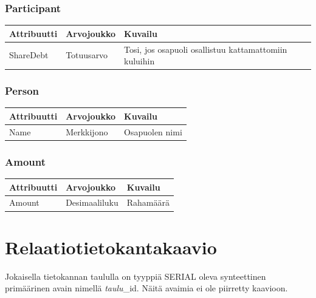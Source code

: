 \documentclass[a4paper,parskip=half]{scrartcl}
\begin{document}
\subsubsection{Participant}
\begin{tabular}{ | l | l | l | }
  \hline
  \textbf{Attribuutti} & \textbf{Arvojoukko} & \textbf{Kuvailu} \\ \hline
  ShareDebt & Totuusarvo & Tosi, jos osapuoli osallistuu
kattamattomiin kuluihin \\ \hline
\end{tabular}

\subsubsection{Person}
\begin{tabular}{ | l | l | l | }
  \hline
  \textbf{Attribuutti} & \textbf{Arvojoukko} & \textbf{Kuvailu} \\ \hline
  Name & Merkkijono & Osapuolen nimi \\ \hline
\end{tabular}

\subsubsection{Amount}
\begin{tabular}{ | l | l | l | }
  \hline
  \textbf{Attribuutti} & \textbf{Arvojoukko} & \textbf{Kuvailu} \\ \hline
  Amount & Desimaaliluku & Rahamäärä \\ \hline
\end{tabular}

\section{Relaatiotietokantakaavio}

Jokaisella tietokannan taululla on tyyppiä SERIAL oleva synteettinen
primäärinen avain nimellä \textit{taulu}\_id. Näitä avaimia ei ole piirretty
kaavioon.
\end{document}
